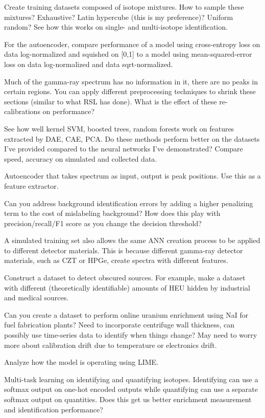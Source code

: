 Create training datasets composed of isotope mixtures. How to sample these mixtures? Exhaustive? Latin hypercube (this is my preference)? Uniform random? See how this works on single- and multi-isotope identification.

For the autoencoder, compare performance of a model using cross-entropy loss on data log-normalized and squished on [0,1] to a model using mean-squared-error loss on data log-normalized and data sqrt-normalized.


 

Much of the gamma-ray spectrum has no information in it, there are no peaks in certain regions. You can apply different preprocessing techniques to shrink these sections (similar to what RSL has done). What is the effect of these re-calibrations on performance?

See how well kernel SVM, boosted trees, random forests work on features extracted by DAE, CAE, PCA. Do these methods perform better on the datasets I've provided compared to the neural networks I've demonstrated? Compare speed, accuracy on simulated and collected data.

Autoencoder that takes spectrum as input, output is peak positions. Use this as a feature extractor. 

Can you address background identification errors by adding a higher penalizing term to the cost of mislabeling background? How does this play with precision/recall/F1 score as you change the decision threshold?

A simulated training set also allows the same ANN creation process to be applied to different detector materials. This is because different gamma-ray detector materials, such as CZT or HPGe, create spectra with different features.

Construct a dataset to detect obscured sources. For example, make a dataset with different (theoretically identifiable) amounts of HEU hidden by industrial and medical sources. 

Can you create a dataset to perform online uranium enrichment using NaI for fuel fabrication plants? Need to incorporate centrifuge wall thickness, can possibly use time-series data to identify when things change? May need to worry more about calibration drift due to temperature or electronics drift.

Analyze how the model is operating using LIME.

Multi-task learning on identifying and quantifying isotopes. Identifying can use a softmax output on one-hot encoded outputs while quantifying can use a separate softmax output on quantities. Does this get us better enrichment measurement and identification performance?